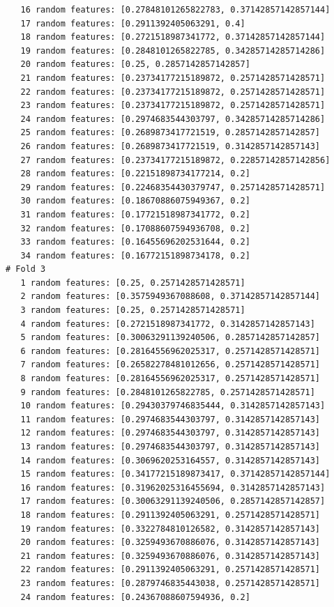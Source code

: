 \documentclass[12pt]{amsart}
\begin{document}
\begin{verbatim}
   16 random features: [0.27848101265822783, 0.37142857142857144]
   17 random features: [0.2911392405063291, 0.4]
   18 random features: [0.2721518987341772, 0.37142857142857144]
   19 random features: [0.2848101265822785, 0.34285714285714286]
   20 random features: [0.25, 0.2857142857142857]
   21 random features: [0.23734177215189872, 0.2571428571428571]
   22 random features: [0.23734177215189872, 0.2571428571428571]
   23 random features: [0.23734177215189872, 0.2571428571428571]
   24 random features: [0.2974683544303797, 0.34285714285714286]
   25 random features: [0.2689873417721519, 0.2857142857142857]
   26 random features: [0.2689873417721519, 0.3142857142857143]
   27 random features: [0.23734177215189872, 0.22857142857142856]
   28 random features: [0.22151898734177214, 0.2]
   29 random features: [0.22468354430379747, 0.2571428571428571]
   30 random features: [0.18670886075949367, 0.2]
   31 random features: [0.17721518987341772, 0.2]
   32 random features: [0.17088607594936708, 0.2]
   33 random features: [0.16455696202531644, 0.2]
   34 random features: [0.16772151898734178, 0.2]
# Fold 3
   1 random features: [0.25, 0.2571428571428571]
   2 random features: [0.3575949367088608, 0.37142857142857144]
   3 random features: [0.25, 0.2571428571428571]
   4 random features: [0.2721518987341772, 0.3142857142857143]
   5 random features: [0.30063291139240506, 0.2857142857142857]
   6 random features: [0.28164556962025317, 0.2571428571428571]
   7 random features: [0.26582278481012656, 0.2571428571428571]
   8 random features: [0.28164556962025317, 0.2571428571428571]
   9 random features: [0.2848101265822785, 0.2571428571428571]
   10 random features: [0.29430379746835444, 0.3142857142857143]
   11 random features: [0.2974683544303797, 0.3142857142857143]
   12 random features: [0.2974683544303797, 0.3142857142857143]
   13 random features: [0.2974683544303797, 0.3142857142857143]
   14 random features: [0.3069620253164557, 0.3142857142857143]
   15 random features: [0.34177215189873417, 0.37142857142857144]
   16 random features: [0.31962025316455694, 0.3142857142857143]
   17 random features: [0.30063291139240506, 0.2857142857142857]
   18 random features: [0.2911392405063291, 0.2571428571428571]
   19 random features: [0.3322784810126582, 0.3142857142857143]
   20 random features: [0.3259493670886076, 0.3142857142857143]
   21 random features: [0.3259493670886076, 0.3142857142857143]
   22 random features: [0.2911392405063291, 0.2571428571428571]
   23 random features: [0.2879746835443038, 0.2571428571428571]
   24 random features: [0.24367088607594936, 0.2]

\end{verbatim}
\end{document}
